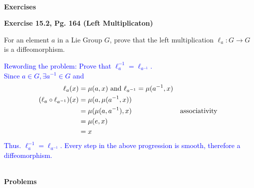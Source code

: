 \documentclass[12pt,a4paper]{report}
\newcommand{\BLUE}[1]{\textcolor{blue}{#1}}
\begin{document}
\noindent \textbf{\\\large{Exercises\\}}

\noindent \textbf{Exercise 15.2, Pg. 164 (Left Multiplicaton)}

For an element $a$ in a Lie Group $G$, prove that the left multiplication $\ell_a: G \to G$ is a diffeomorphism.

\BLUE{Rewording the problem: Prove that $\ell_a^{-1} = \ell_{a^{-1}}$.\\\indent
Since $a \in G, \exists a^{-1}\in G$ and
\begin{align*}
	\ell_a(x) &= \mu(a,x) \text{ and } \ell_{a^{-1}} = \mu(a^{-1},x)\\
	(\ell_a\circ\ell_{a^{-1}})(x) &= \mu(a, \mu(a^{-1}, x)) \\
	&= \mu(\mu(a,a^{-1}),x) & \text{associativity} \\
	&= \mu(e, x) \\
	&= x
\end{align*}\indent Thus. $\ell_a^{-1} = \ell_{a^{-1}}$.  Every step in the above progression is smooth, therefore a diffeomorphism.
}

\noindent \textbf{\\\large{Problems}}
\end{document}
